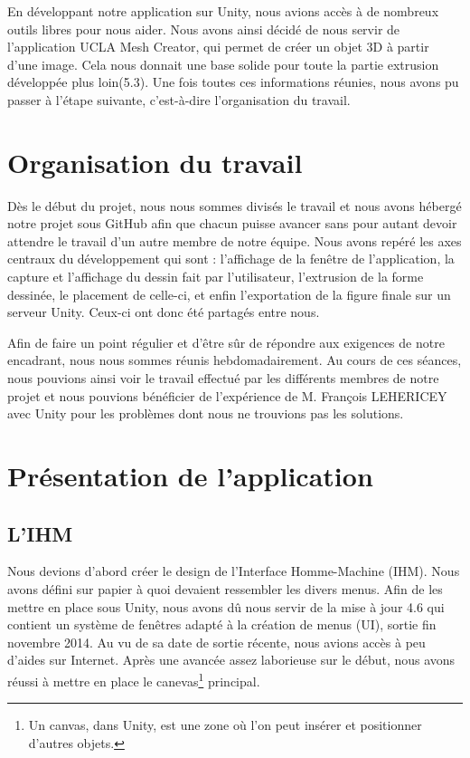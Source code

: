\documentclass[a4paper,11pt]{article}
\begin{document}
		En développant notre application sur Unity, nous avions accès à de nombreux outils libres pour nous aider. Nous avons ainsi décidé de nous servir de l'application UCLA Mesh Creator, qui permet de créer un objet 3D à partir d'une image. Cela nous donnait une base solide pour toute la partie extrusion développée plus loin(5.3). Une fois toutes ces informations réunies, nous avons pu passer à l'étape suivante, c'est-à-dire l'organisation du travail.
	\section{Organisation du travail}
	Dès le début du projet, nous nous sommes divisés le travail et nous avons hébergé notre projet sous GitHub afin que chacun puisse avancer sans pour autant devoir attendre le travail d'un autre membre de notre équipe. Nous avons repéré les axes centraux du développement qui sont : l'affichage de la fenêtre de l'application, la capture et l'affichage du dessin fait par l'utilisateur, l'extrusion de la forme dessinée, le placement de celle-ci, et enfin l'exportation de la figure finale sur un serveur Unity. Ceux-ci ont donc été partagés entre nous.
	
	Afin de faire un point régulier et d'être sûr de répondre aux exigences de notre encadrant, nous nous sommes réunis hebdomadairement. Au cours de ces séances, nous pouvions ainsi voir le travail effectué par les différents membres de notre projet et nous pouvions bénéficier de l'expérience de M. François LEHERICEY avec Unity pour les problèmes dont nous ne trouvions pas les solutions.
	
	\section{Présentation de l'application}
		\subsection{L'IHM}
			Nous devions d'abord créer le design de l'Interface Homme-Machine (IHM). Nous avons défini sur papier à quoi devaient ressembler les divers menus. Afin de les mettre en place sous Unity, nous avons dû nous servir de la mise à jour 4.6 qui contient un système de fenêtres adapté à la création de menus (UI), sortie fin novembre 2014. Au vu de sa date de sortie récente, nous avions accès à peu d'aides sur Internet. Après une avancée assez laborieuse sur le début, nous avons réussi à mettre en place le canevas\footnote{Un canvas, dans Unity, est une zone où l'on peut insérer et positionner d'autres objets.} principal. 
			
\end{document}
